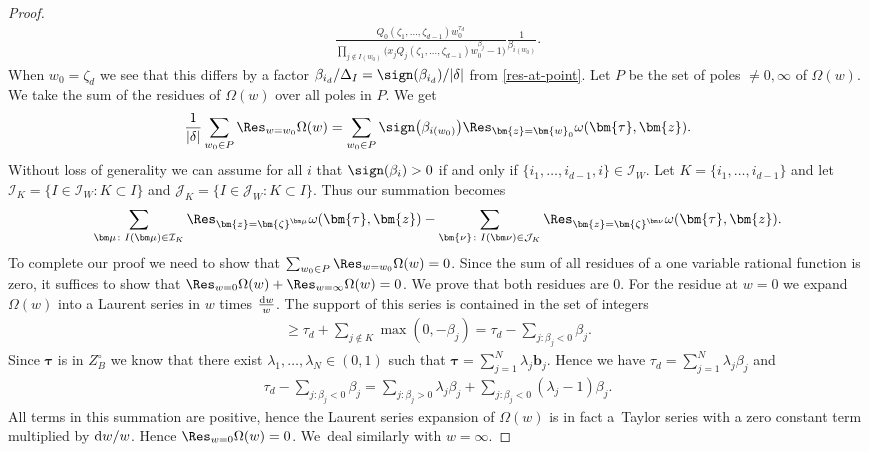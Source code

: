 \begin{proof}
\begin{gather*}
\frac{Q_0(\zeta_1,\dots,\zeta_{d-1})w_0^{\tau_d}}{\prod_{j\not\in I(w_0)}
\big(x_jQ_j(\zeta_1,\dots,\zeta_{d-1})w_0^{\beta_j}-1\big)}\frac{1}{\beta_{i(w_0)}}.
\end{gather*}
When $w_0=\zeta_d$ we see that this differs by a factor
$\beta_{i_d}/\Delta_I=\sign(\beta_{i_d})/|\delta|$ from \eqref{res-at-point}.
Let $P$ be the set of poles $\ne0,\infty$ of $\Omega(w)$. We take the sum of the residues
of $\Omega(w)$ over all poles in $P$. We get
\begin{gather*}
\frac{1}{|\delta|}\sum_{w_0\in P}\Res_{w=w_0}\Omega(w)=\sum_{w_0\in P}\sign\big(\beta_{i(w_0)}\big)\Res_{\bm{z}=\bm{w}_0}
\omega(\bm{\tau},\bm{z}).
\end{gather*}
Without loss of generality we can assume for all $i$ that $\sign(\beta_i)>0$ if
and only if $\{i_1,\dots,i_{d-1},i\}\allowbreak\in\mathcal{I}_W$. Let $K=\{i_1,\dots,i_{d-1}\}$ and let $\mathcal{I}_K = \{I \in \mathcal{I}_W\colon K \subset I\}$ and $\mathcal{J}_K = \{I \in \mathcal{J}_W\colon K \subset I\}$.
Thus our summation becomes
\begin{gather*}
\sum_{\bm\mu\colon I(\bm\mu)\in\mathcal{I}_K}\Res_{\bm{z}=\bm{\zeta}^{\bm\mu}}\omega(\bm{\tau},\bm{z})
-\sum_{\bm{\nu}\colon I(\bm\nu)\in\mathcal{J}_K}\Res_{\bm{z}=\bm{\zeta}^{\bm\nu}}\omega(\bm{\tau},\bm{z}).
\end{gather*}
To complete our proof we need to show that $\sum_{w_0\in P}\Res_{w=w_0}\Omega(w)=0$.
Since the sum of all residues of a one variable rational function is zero, it suffices
to show that $\Res_{w=0}\Omega(w)+\Res_{w=\infty}\Omega(w)=0$. We prove that both
residues are $0$. For the residue at $w=0$ we expand~$\Omega(w)$ into a Laurent series in
$w$ times $\frac{{\rm d}w}{w}$. The support of this series is contained in the set of integers
\begin{gather*}
\ge \tau_d+\sum_{j\not\in K}\max(0,-\beta_j)=\tau_d-\sum_{j\colon \beta_j<0}\beta_j.
\end{gather*}
Since $\bm\tau$ is in $Z_B^{\circ}$ we know that there exist $\lambda_1,
\dots,\lambda_N\in(0,1)$ such that $\bm\tau=\sum_{j=1}^N\lambda_j\bm{b}_j$.
Hence we have $\tau_d=\sum_{j=1}^N\lambda_j\beta_j$ and
\begin{gather*}
\tau_d-\sum_{j\colon \beta_j<0}\beta_j =\sum_{j\colon \beta_j>0}\lambda_j\beta_j+
\sum_{j\colon \beta_j<0}(\lambda_j-1)\beta_j.
\end{gather*}
All terms in this summation are positive, hence the Laurent series expansion
of $\Omega(w)$ is in fact a~Taylor series with a zero constant term multiplied by ${\rm d}w/w$.
Hence $\Res_{w=0}\Omega(w)=0$. We~deal similarly with $w=\infty$.
\end{proof}


